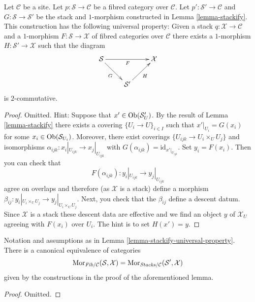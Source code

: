 \begin{lemma}
\label{lemma-stackify-universal-property}
Let $\mathcal{C}$ be a site.
Let $p : \mathcal{S} \to \mathcal{C}$ be a fibred category over $\mathcal{C}$.
Let $p' : \mathcal{S}' \to \mathcal{C}$ and $G : \mathcal{S} \to \mathcal{S}'$
be the stack and $1$-morphism constructed in Lemma \ref{lemma-stackify}.
This construction has the following universal property: Given a stack
$q : \mathcal{X} \to \mathcal{C}$ and a $1$-morphism
$F : \mathcal{S} \to \mathcal{X}$ of fibred categories over $\mathcal{C}$
there exists a $1$-morphism $H : \mathcal{S}' \to \mathcal{X}$
such that the diagram
$$
\xymatrix{
\mathcal{S} \ar[rr]_F \ar[rd]_G & & \mathcal{X} \\
& \mathcal{S}' \ar[ru]_H
}
$$
is $2$-commutative.
\end{lemma}

\begin{proof}
Omitted. Hint: Suppose that $x' \in \mathop{\mathrm{Ob}}\nolimits(\mathcal{S}'_U)$.
By the result of Lemma \ref{lemma-stackify}
there exists a covering $\{U_i \to U\}_{i \in I}$
such that $x'|_{U_i} = G(x_i)$ for some $x_i \in \mathop{\mathrm{Ob}}\nolimits(\mathcal{S}_{U_i})$.
Moreover, there exist coverings $\{U_{ijk} \to U_i \times_U U_j\}$
and isomorphisms $\alpha_{ijk} : x_i|_{U_{ijk}} \to x_j|_{U_{ijk}}$
with $G(\alpha_{ijk}) = \text{id}_{x'|_{U_{ijk}}}$. Set $y_i = F(x_i)$.
Then you can check that
$$
F(\alpha_{ijk}) : y_i|_{U_{ijk}} \to y_j|_{U_{ijk}}
$$
agree on overlaps and therefore (as $\mathcal{X}$ is a stack) define
a morphism $\beta_{ij} : y_i|_{U_i \times_U U_j} \to y_j|_{U_i \times_U U_j}$.
Next, you check that the $\beta_{ij}$ define a descent datum. Since
$\mathcal{X}$ is a stack these descent data are effective and we find
an object $y$ of $\mathcal{X}_U$ agreeing with $F(x_i)$ over $U_i$.
The hint is to set $H(x') = y$.
\end{proof}

\begin{lemma}
\label{lemma-stackify-universal-property-more}
Notation and assumptions as in
Lemma \ref{lemma-stackify-universal-property}.
There is a canonical equivalence of categories
$$
\mathop{\mathrm{Mor}}\nolimits_{\textit{Fib}/\mathcal{C}}(\mathcal{S}, \mathcal{X})
=
\mathop{\mathrm{Mor}}\nolimits_{\textit{Stacks}/\mathcal{C}}(\mathcal{S}', \mathcal{X})
$$
given by the constructions in the proof of the aforementioned lemma.
\end{lemma}

\begin{proof}
Omitted.
\end{proof}

